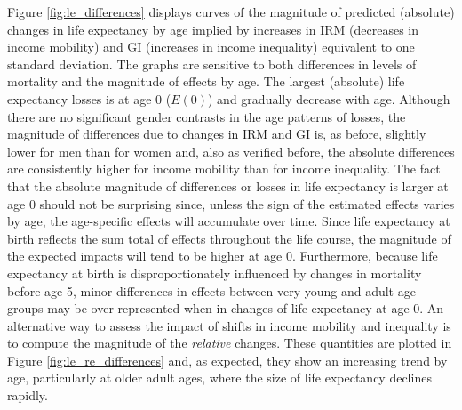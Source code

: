 \documentclass[11pt]{article}
\begin{document}
Figure \ref{fig:le_differences} displays curves of the magnitude of predicted (absolute) changes in life expectancy by age implied by increases in IRM (decreases in income mobility) and GI (increases in income inequality) equivalent to one standard deviation. The graphs are sensitive to both differences in levels of mortality and the magnitude of effects by age. The largest (absolute) life expectancy losses is at age 0 ($E(0)$) and gradually decrease with age. Although there are no significant gender contrasts in the  age patterns of losses, the magnitude of differences due to changes in IRM and GI is, as before, slightly lower for men than for women and, also as verified before, the absolute differences are consistently higher for income mobility than for income inequality. The fact that the absolute magnitude of differences or losses in life expectancy is larger at age 0 should not be surprising since, unless the sign of the estimated effects varies by age, the age-specific effects will accumulate over time. Since life expectancy at birth reflects the sum total of effects throughout the life course, the magnitude of the expected impacts will tend to be higher at age 0. Furthermore, because life expectancy at birth is disproportionately influenced by changes in mortality before age 5, minor differences in effects between very young and adult age groups may be over-represented when in changes of life expectancy at age 0. An alternative way to assess the impact of shifts in income mobility and inequality is to compute the magnitude of the \textit{relative} changes. These quantities are plotted in Figure \ref{fig:le_re_differences} and, as expected, they show an increasing trend by age, particularly at older adult ages, where the size of life expectancy declines rapidly.


\end{document}
